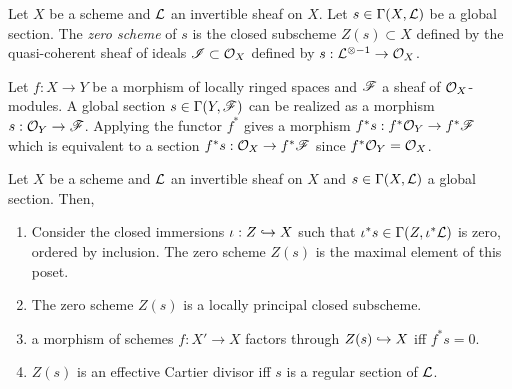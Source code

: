 \documentclass[12pt]{article}
\begin{document}
\begin{definition}
Let $X$ be a scheme and $\mathcal{L}$ an invertible sheaf on $X$. Let $s \in \Gamma(X, \mathcal{L})$ be a global section. The \textit{zero scheme} of $s$ is the closed subscheme $Z(s) \subset X$ defined by the quasi-coherent sheaf of ideals $\mathscr{I} \subset \mathcal{O}_{X}$ defined by $s : \mathcal{L}^{\otimes -1} \to \mathcal{O}_{X}$. 
\end{definition}

\begin{remark}
Let $f : X \to Y$ be a morphism of locally ringed spaces and $\mathscr{F}$ a sheaf of $\mathcal{O}_{X}$-modules. A global section $s \in \Gamma(Y, \mathscr{F})$ can be realized as a morphism $s : \mathcal{O}_{Y} \to \mathscr{F}$. Applying the functor $f^*$ gives a morphism $f^* s : f^* \mathcal{O}_{Y} \to f^* \mathscr{F}$ which is equivalent to a section $f^* s : \mathcal{O}_{X} \to f^* \mathscr{F}$ since $f^* \mathcal{O}_{Y} = \mathcal{O}_{X}$. 
\end{remark}

\begin{lemma}
Let $X$ be a scheme and $\mathcal{L}$ an invertible sheaf on $X$ and $s \in \Gamma(X, \mathcal{L})$ a global section. Then,
\begin{enumerate}
\item Consider the closed immersions $\iota : Z \hookrightarrow X$ such that $\iota^* s \in \Gamma(Z, \iota^* \mathcal{L})$ is zero, ordered by inclusion. The zero scheme $Z(s)$ is the maximal element of this poset.
\item The zero scheme $Z(s)$ is a locally principal closed subscheme.
\item a morphism of schemes $f : X' \to X$ factors through $Z(s) \hookrightarrow X$ iff $f^* s = 0$.
\item $Z(s)$ is an effective Cartier divisor iff $s$ is a regular section of $\mathcal{L}$.
\end{enumerate}
\end{lemma}
\end{document}
